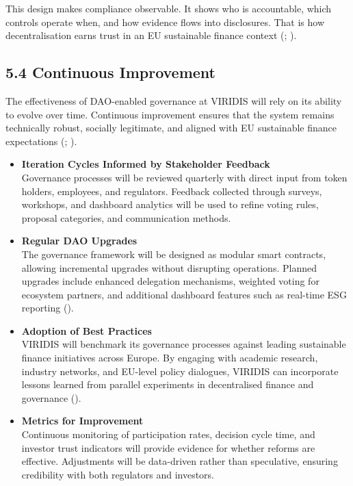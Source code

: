 \documentclass[
  english,
  12pt,
  oneside,
  open=any]{scrbook}
\begin{document}
This design makes compliance observable. It shows who is accountable,
which controls operate when, and how evidence flows into disclosures.
That is how decentralisation earns trust in an EU sustainable finance
context
(; ).

\subsection{5.4 Continuous Improvement}\label{sec-improvement}

The effectiveness of DAO-enabled governance at VIRIDIS will rely on its
ability to evolve over time. Continuous improvement ensures that the
system remains technically robust, socially legitimate, and aligned with
EU sustainable finance expectations
(; ).

\begin{itemize}
\item
  \textbf{Iteration Cycles Informed by Stakeholder Feedback}\\
  Governance processes will be reviewed quarterly with direct input from
  token holders, employees, and regulators. Feedback collected through
  surveys, workshops, and dashboard analytics will be used to refine
  voting rules, proposal categories, and communication methods.
\item
  \textbf{Regular DAO Upgrades}\\
  The governance framework will be designed as modular smart contracts,
  allowing incremental upgrades without disrupting operations. Planned
  upgrades include enhanced delegation mechanisms, weighted voting for
  ecosystem partners, and additional dashboard features such as
  real-time ESG reporting
  ().
\item
  \textbf{Adoption of Best Practices}\\
  VIRIDIS will benchmark its governance processes against leading
  sustainable finance initiatives across Europe. By engaging with
  academic research, industry networks, and EU-level policy dialogues,
  VIRIDIS can incorporate lessons learned from parallel experiments in
  decentralised finance and governance
  ().
\item
  \textbf{Metrics for Improvement}\\
  Continuous monitoring of participation rates, decision cycle time, and
  investor trust indicators will provide evidence for whether reforms
  are effective. Adjustments will be data-driven rather than
  speculative, ensuring credibility with both regulators and investors.
\end{itemize}
\end{document}
